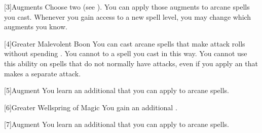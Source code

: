         [3]{Augments}
        Choose two  (see ).
        You can apply those augments to arcane spells you cast.
        Whenever you gain access to a new spell level, you may change which augments you know.

        [4]{Greater Malevolent Boon} You can cast arcane spells that make attack rolls without spending .
        You cannot  to a spell you cast in this way.
        You cannot use this ability on spells that do not normally have attacks, even if you apply an  that makes a separate attack.

        [5]{Augment}
        You learn an additional  that you can apply to arcane spells.

        [6]{Greater Wellspring of Magic} You gain an additional .

        [7]{Augment}
        You learn an additional  that you can apply to arcane spells.
